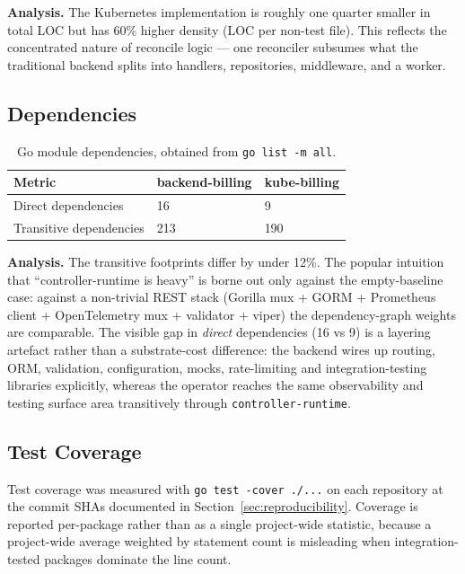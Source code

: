 \textbf{Analysis.} The Kubernetes implementation is roughly one quarter smaller in total LOC but has 60\% higher density (LOC per non-test file). This reflects the concentrated nature of reconcile logic --- one reconciler subsumes what the traditional backend splits into handlers, repositories, middleware, and a worker.

\subsection{Dependencies}

\begin{table}[h]
\centering
\caption{Go module dependencies, obtained from \texttt{go list -m all}.}
\label{tab:deps-comparison}
\small\begin{tabularx}{\textwidth}{@{}lXX@{}}
\toprule
\textbf{Metric} & \textbf{backend-billing} & \textbf{kube-billing} \\ \midrule
Direct dependencies         & 16  & 9   \\
Transitive dependencies     & 213 & 190 \\ \bottomrule
\end{tabularx}
\end{table}

\textbf{Analysis.} The transitive footprints differ by under 12\%. The popular intuition that ``controller-runtime is heavy'' is borne out only against the empty-baseline case: against a non-trivial REST stack (Gorilla mux + GORM + Prometheus client + OpenTelemetry mux + validator + viper) the dependency-graph weights are comparable. The visible gap in \emph{direct} dependencies (16 vs 9) is a layering artefact rather than a substrate-cost difference: the backend wires up routing, ORM, validation, configuration, mocks, rate-limiting and integration-testing libraries explicitly, whereas the operator reaches the same observability and testing surface area transitively through \texttt{controller-runtime}.

\subsection{Test Coverage}\label{sec:coverage-results}

Test coverage was measured with \texttt{go test -cover ./...} on each repository at the commit SHAs documented in Section~\ref{sec:reproducibility}. Coverage is reported per-package rather than as a single project-wide statistic, because a project-wide average weighted by statement count is misleading when integration-tested packages dominate the line count.

